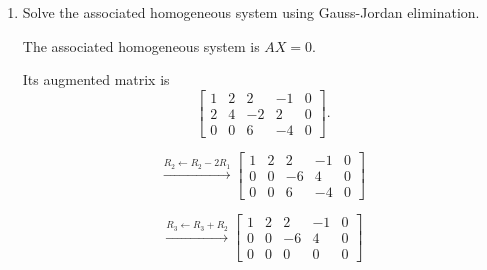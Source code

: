 \begin{enumerate}[label=\alph*)]
\begin{answer}
    Then
    $$
    \begin{aligned}
    Av
    &=
    \begin{bmatrix}
    1&2&2&-1\\
    2&4&-2&2\\
    0&0&6&-4
    \end{bmatrix}
    \begin{bmatrix}
    2\\0\\0\\-3
    \end{bmatrix}\\[6pt]
    &=
    \begin{bmatrix}
    5\\-2\\12
    \end{bmatrix}
    \neq B.
    \end{aligned}
    $$

    Hence $v$ is not a solution of $(S)$.

    {\color{red}
    \textbf{Note:} To verify a particular solution, it is sufficient to check $AX=B$.
    The entire system need not be solved.}
\end{answer}

\item Solve the associated homogeneous
system using Gauss-Jordan elimination.

\begin{answer}
    The associated homogeneous system is $AX=0$.

    Its augmented matrix is
    $$
    \left[
    \begin{array}{cccc|c}
    1&2&2&-1&0\\
    2&4&-2&2&0\\
    0&0&6&-4&0
    \end{array}
    \right].
    $$

    $$
    \xrightarrow{R_2\leftarrow R_2-2R_1}
    \left[
    \begin{array}{cccc|c}
    1&2&2&-1&0\\
    0&0&-6&4&0\\
    0&0&6&-4&0
    \end{array}
    \right]
    $$

    $$
    \xrightarrow{R_3\leftarrow R_3+R_2}
    \left[
    \begin{array}{cccc|c}
    1&2&2&-1&0\\
    0&0&-6&4&0\\
    0&0&0&0&0
    \end{array}
    \right]
    $$


\end{answer}
\end{enumerate}
